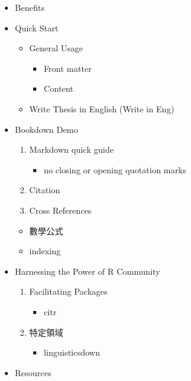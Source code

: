 \documentclass[oneside]{book}
\providecommand{\tightlist}{%
  \setlength{\itemsep}{0pt}\setlength{\parskip}{0pt}}
\theoremstyle{definition}
\theoremstyle{definition}
\theoremstyle{definition}
\theoremstyle{remark}
\begin{document}
\begin{itemize}
\tightlist
\item
  Benefits
\item
  Quick Start

  \begin{itemize}
  \tightlist
  \item
    General Usage

    \begin{itemize}
    \tightlist
    \item
      Front matter
    \item
      Content
    \end{itemize}
  \item
    Write Thesis in English (Write in Eng)
  \end{itemize}
\item
  Bookdown Demo

  \begin{enumerate}
  \def\labelenumi{\alph{enumi})}
  \tightlist
  \item
    Markdown quick guide

    \begin{itemize}
    \tightlist
    \item
      no closing or opening quotation marks
    \end{itemize}
  \item
    Citation
  \item
    Cross References
  \end{enumerate}

  \begin{itemize}
  \tightlist
  \item
    數學公式
  \item
    indexing
  \end{itemize}
\item
  Harnessing the Power of R Community

  \begin{enumerate}
  \def\labelenumi{\Alph{enumi})}
  \tightlist
  \item
    Facilitating Packages

    \begin{itemize}
    \tightlist
    \item
      citr
    \end{itemize}
  \item
    特定領域

    \begin{itemize}
    \tightlist
    \item
      linguisticsdown
    \end{itemize}
  \end{enumerate}
\item
  Resources


\end{itemize}
\end{document}
